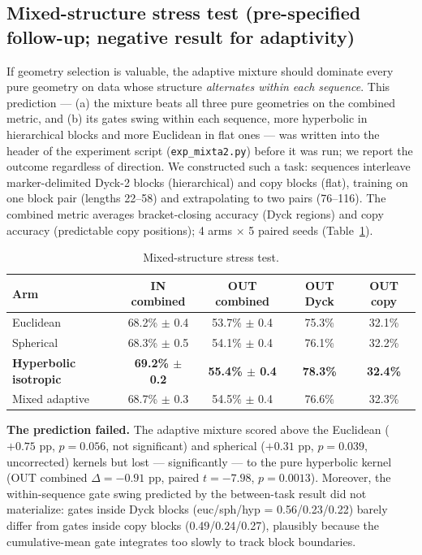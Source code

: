 \documentclass[11pt]{article}
\begin{document}
\subsection{Mixed-structure stress test (pre-specified follow-up; negative result for adaptivity)}\label{sec:stress}

If geometry selection is valuable, the adaptive mixture should dominate every pure geometry on data whose structure \emph{alternates within each sequence}. This prediction --- (a) the mixture beats all three pure geometries on the combined metric, and (b) its gates swing within each sequence, more hyperbolic in hierarchical blocks and more Euclidean in flat ones --- was written into the header of the experiment script (\texttt{exp\_mixta2.py}) before it was run; we report the outcome regardless of direction. We constructed such a task: sequences interleave marker-delimited Dyck-2 blocks (hierarchical) and copy blocks (flat), training on one block pair (lengths 22--58) and extrapolating to two pairs (76--116). The combined metric averages bracket-closing accuracy (Dyck regions) and copy accuracy (predictable copy positions); 4 arms $\times$ 5 paired seeds (Table~\ref{tab:stress}).

\begin{table}[h]
\centering\small
\begin{tabular}{lcccc}
\toprule
Arm & IN combined & OUT combined & OUT Dyck & OUT copy \\
\midrule
Euclidean & 68.2\% $\pm$ 0.4 & 53.7\% $\pm$ 0.4 & 75.3\% & 32.1\% \\
Spherical & 68.3\% $\pm$ 0.5 & 54.1\% $\pm$ 0.4 & 76.1\% & 32.2\% \\
\textbf{Hyperbolic isotropic} & \textbf{69.2\% $\pm$ 0.2} & \textbf{55.4\% $\pm$ 0.4} & \textbf{78.3\%} & \textbf{32.4\%} \\
Mixed adaptive & 68.7\% $\pm$ 0.3 & 54.5\% $\pm$ 0.4 & 76.6\% & 32.3\% \\
\bottomrule
\end{tabular}
\caption{Mixed-structure stress test.}
\label{tab:stress}
\end{table}

\textbf{The prediction failed.} The adaptive mixture scored above the Euclidean ($+0.75$ pp, $p = 0.056$, not significant) and spherical ($+0.31$ pp, $p = 0.039$, uncorrected) kernels but lost --- significantly --- to the pure hyperbolic kernel (OUT combined $\Delta = -0.91$ pp, paired $t = -7.98$, $p = 0.0013$). Moreover, the within-sequence gate swing predicted by the between-task result did not materialize: gates inside Dyck blocks (euc/sph/hyp = 0.56/0.23/0.22) barely differ from gates inside copy blocks (0.49/0.24/0.27), plausibly because the cumulative-mean gate integrates too slowly to track block boundaries.
\end{document}
